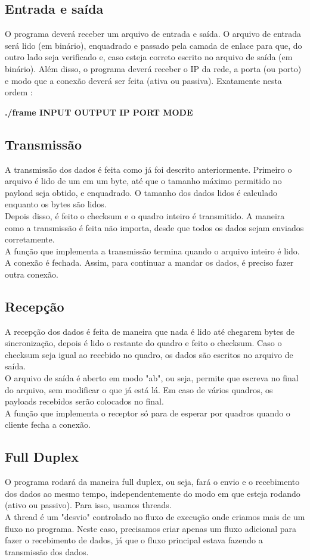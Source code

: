 \documentclass[10pt]{article}
\begin{document}
		\subsection{Entrada e saída}
			O programa deverá receber um arquivo de entrada e saída. O arquivo de entrada será lido (em binário), enquadrado e passado pela camada de enlace para que, do outro lado seja verificado e, caso esteja correto escrito no arquivo de saída (em binário).
			Além disso, o programa deverá receber o IP da rede, a porta (ou porto) e modo que a conexão deverá ser feita (ativa ou passiva). Exatamente nesta ordem :
			
			\textbf{./frame INPUT OUTPUT IP PORT MODE}
		\subsection{Transmissão}
			A transmissão dos dados é feita como já foi descrito anteriormente. Primeiro o arquivo é lido de um em um byte, até que o tamanho máximo permitido no payload seja obtido, e enquadrado. O tamanho dos dados lidos é calculado enquanto os bytes são lidos. 
			\\Depois disso, é feito o checksum e o quadro inteiro é transmitido. A maneira como a transmissão é feita não importa, desde que todos os dados sejam enviados corretamente.
			\\A função que implementa a transmissão termina quando o arquivo inteiro é lido. A conexão é fechada. Assim, para continuar a mandar os dados, é preciso fazer outra conexão.
		\subsection{Recepção}
			A recepção dos dados é feita de maneira que nada é lido até chegarem bytes de sincronização, depois é lido o restante do quadro e feito o checksum. Caso o checksum seja igual ao recebido no quadro, os dados são escritos no arquivo de saída.
			\\O arquivo de saída é aberto em modo "ab", ou seja, permite que escreva no final do arquivo, sem modificar o que já está lá. Em caso de vários quadros, os payloads recebidos serão colocados no final.
			\\A função que implementa o receptor só para de esperar por quadros quando o cliente fecha a conexão. 
		\subsection{Full Duplex}
			O programa rodará da maneira full duplex, ou seja, fará o envio e o recebimento dos dados ao mesmo tempo, independentemente do modo em que esteja rodando (ativo ou passivo). Para isso, usamos threads. 
			\\ A thread é um "desvio" controlado no fluxo de execução onde criamos mais de um fluxo no programa. Neste caso, precisamos criar apenas um fluxo adicional para fazer o recebimento de dados, já que o fluxo principal estava fazendo a transmissão dos dados.
\end{document}
